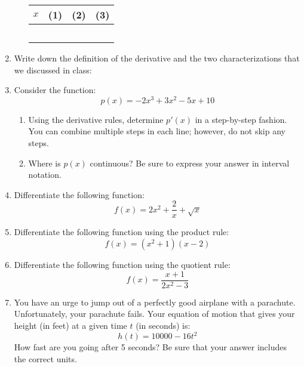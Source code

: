 \documentclass[letterpaper,12pt,fleqn]{article}
\begin{document}
\begin{enumerate}[left=0pt]
\begin{enumerate}
    \begin{tabular}{|p{0.5in}|c|c|c|}
      \hline
      \(x\) & (1) & (2) & (3) \\
      \hline
      & & & \\
      \hline
      & & & \\
      \hline
      & & & \\
      \hline
      & & & \\
      \hline
      & & & \\
      \hline
    \end{tabular}
  \end{enumerate}

  \newpage

\item Write down the definition of the derivative and the two characterizations that we discussed in class:

  \bigskip

\item Consider the function:
  \[p(x)=-2x^3+3x^2-5x+10\]
  \begin{enumerate}
  \item Using the derivative rules, determine \(p'(x)\) in a step-by-step fashion.  You can combine multiple steps in each
    line; however, do not skip any steps.
  \item Where is \(p(x)\) continuous?  Be sure to express your answer in interval notation.
  \end{enumerate}

  \bigskip

\item Differentiate the following function:
  \[f(x)=2x^2+\frac{2}{x}+\sqrt{x}\]

  \bigskip

\item Differentiate the following function using the product rule:
  \[f(x)=(x^2+1)(x-2)\]

  \bigskip

\item Differentiate the following function using the quotient rule:
  \[f(x)=\frac{x+1}{2x^2-3}\]

  \bigskip

\item You have an urge to jump out of a perfectly good airplane with a parachute.  Unfortunately, your parachute fails.
  Your equation of motion that gives your height (in feet) at a given time \(t\) (in seconds) is:
  \[h(t)=10000-16t^2\]
  How fast are you going after 5 seconds?  Be sure that your answer includes the correct units.


\end{enumerate}
\end{document}
